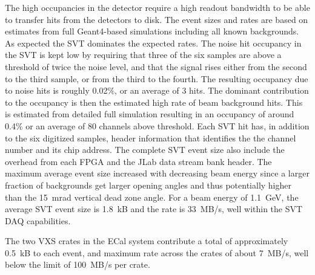 The high occupancies in the detector require a high readout bandwidth to be able to transfer hits from the 
detectors to disk. The event sizes and rates are based on estimates from full Geant4-based simulations 
including all known backgrounds. As expected the SVT dominates the expected rates. 
The noise hit occupancy in the SVT is kept low by requiring that three of the six samples are above a
threshold of twice the noise level, and that the signal rises either from the second to the third sample, or from the third to the fourth. 
The resulting occupancy due to noise hits is roughly 0.02\%, or an average of 3 hits.
The dominant contribution to the occupancy is then 
the estimated high rate of beam background hits. This is estimated 
from detailed full simulation resulting in an occupancy of around 0.4\% or an average of 80 channels above threshold.  
Each SVT hit has, in addition to the six digitized samples,  header information that identifies the 
the channel number and its chip address. The complete SVT event size also 
include the overhead from each FPGA and the JLab data stream bank header.  
The maximum average event size increased with decreasing beam energy since a larger 
fraction of backgrounds get larger opening angles and thus potentially higher than the 15~mrad 
vertical dead zone angle. For a beam energy of 1.1~GeV, the average SVT event size is 1.8~kB and 
the rate is 33~MB/s, well within the SVT DAQ capabilities. 

The two VXS crates in the ECal system contribute a total of 
approximately 0.5~kB to each event, and maximum rate across the crates of about 7~MB/s, well below the limit of 100~MB/s per crate. 

